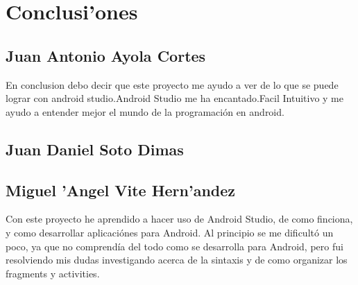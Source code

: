 \chapter{Conclusi'ones}
\section{Juan Antonio Ayola Cortes}
En conclusion debo decir que este proyecto me ayudo a ver de lo que se puede lograr con android studio.Android Studio me ha encantado.Facil Intuitivo y me ayudo a entender mejor el mundo de la programación en android.
\section{Juan Daniel Soto Dimas}

\section{Miguel 'Angel Vite Hern'andez}
Con este proyecto he aprendido a hacer uso de Android Studio, de como finciona, y como desarrollar aplicaciónes para Android. Al principio se me dificultó un poco, ya que no comprendía del todo como se desarrolla para Android, pero fui resolviendo mis dudas investigando acerca de la sintaxis y de como organizar los fragments y activities. 